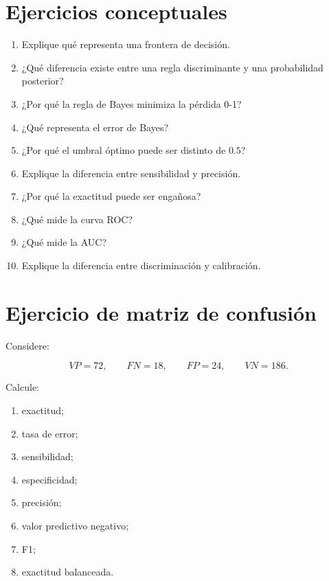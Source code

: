 \documentclass[
  spanish,
  11pt,
  letterpaper,
  DIV=11,
  numbers=noendperiod]{scrreprt}
\providecommand{\tightlist}{%
  \setlength{\itemsep}{0pt}\setlength{\parskip}{0pt}}
\theoremstyle{definition}
\theoremstyle{plain}
\theoremstyle{definition}
\theoremstyle{remark}
\begin{document}
\section{Ejercicios conceptuales}\label{ejercicios-conceptuales-5}

\begin{enumerate}
\def\labelenumi{\arabic{enumi}.}
\tightlist
\item
  Explique qué representa una frontera de decisión.
\item
  ¿Qué diferencia existe entre una regla discriminante y una
  probabilidad posterior?
\item
  ¿Por qué la regla de Bayes minimiza la pérdida 0-1?
\item
  ¿Qué representa el error de Bayes?
\item
  ¿Por qué el umbral óptimo puede ser distinto de \(0.5\)?
\item
  Explique la diferencia entre sensibilidad y precisión.
\item
  ¿Por qué la exactitud puede ser engañosa?
\item
  ¿Qué mide la curva ROC?
\item
  ¿Qué mide la AUC?
\item
  Explique la diferencia entre discriminación y calibración.
\end{enumerate}

\section{Ejercicio de matriz de
confusión}\label{ejercicio-de-matriz-de-confusiuxf3n}

Considere:

\[
VP=72,
\qquad
FN=18,
\qquad
FP=24,
\qquad
VN=186.
\]

Calcule:

\begin{enumerate}
\def\labelenumi{\arabic{enumi}.}
\tightlist
\item
  exactitud;
\item
  tasa de error;
\item
  sensibilidad;
\item
  especificidad;
\item
  precisión;
\item
  valor predictivo negativo;
\item
  F1;
\item
  exactitud balanceada.
\end{enumerate}
\end{document}
